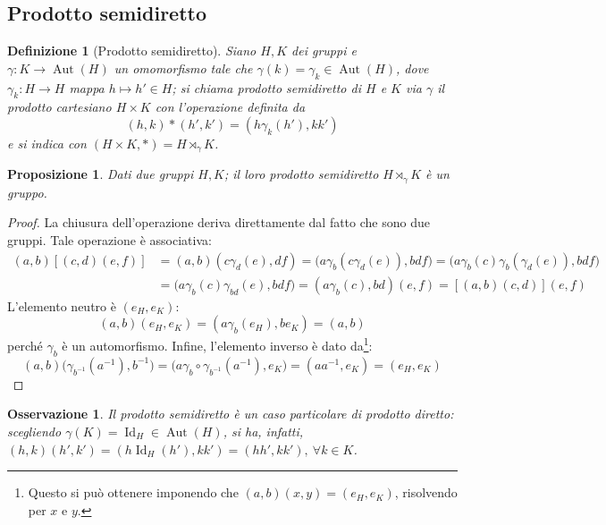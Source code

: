 \documentclass[12pt]{scrartcl}
\theoremstyle{style}
\newtheorem{definizione}{Definizione}[section]
\newtheorem{prop}{Proposizione}[section]
\newtheorem{osservazione}{Osservazione}[section]
\numberwithin{equation}{subsection}
\begin{document}
\subsection{Prodotto semidiretto}
\begin{definizione}
	[Prodotto semidiretto]
	Siano $H ,K$ dei gruppi e $\gamma : K \to \operatorname{Aut} (H)$ un omomorfismo tale che $\gamma(k)=\gamma_k \in \operatorname{Aut} (H)$, dove $\gamma_k : H\to H$ mappa $h\mapsto h' \in H$; si chiama \textit{prodotto semidiretto} di $H$ e $K$ via $\gamma$ il prodotto cartesiano $H\times K$ con l'operazione definita da
	\[
		(h,k) * (h',k') = (h \gamma_k(h'), kk')
	\] 
	e si indica con $(H\times K, *) = H\rtimes _\gamma K$.
\end{definizione}
\begin{prop}
	Dati due gruppi $H,K$; il loro prodotto semidiretto $H \rtimes _\gamma K$ \`e un gruppo.
\end{prop}
	\begin{proof}
		La chiusura dell'operazione deriva direttamente dal fatto che sono due gruppi.
		Tale operazione \`e associativa:
		\[
			\begin{split}
				(a,b)\left[ (c,d)(e,f) \right] &=(a,b)(c\gamma_d(e),df) = \big(a \gamma_b(c\gamma_d(e)),bdf\big)= \big(a\gamma_b(c) \gamma_b(\gamma_d(e)),bdf\big)\\
				&=\big(a \gamma_b(c) \gamma_{bd} (e),bdf\big) = (a\gamma_b(c), bd)(e,f) = \left[ (a,b)(c,d) \right] (e,f)
			\end{split}
		\] 
	L'elemento neutro \`e $(e_H,e_K)$:	
\[
	(a,b) (e_H,e_K) = (a \gamma_b(e_H) , be_K) = (a,b)
\] 
perch\'e $\gamma_b$ \`e un automorfismo.
Infine, l'elemento inverso \`e dato da\footnote{Questo si pu\`o ottenere imponendo che $(a,b)(x,y) = (e_H,e_K)$, risolvendo per $x$ e $y$.}:
\[
(a,b) \big(\gamma_{b^{-1}} (a^{-1}), b^{-1}\big) = \big(a \gamma_{b} \circ \gamma_{b^{-1}}(a^{-1}) , e_K \big)=(a a^{-1},e_K) = (e_H,e_K)
\] 
	\end{proof}
\begin{osservazione}
Il prodotto semidiretto \`e un caso particolare di prodotto diretto: scegliendo $\gamma(K) = \operatorname{Id} _H \in \operatorname{Aut} (H)$, si ha, infatti, $(h,k)(h',k') = (h\operatorname{Id}_H(h'),kk') = (hh',k k'), \ \forall k \in K$.
\end{osservazione}
\end{document}
